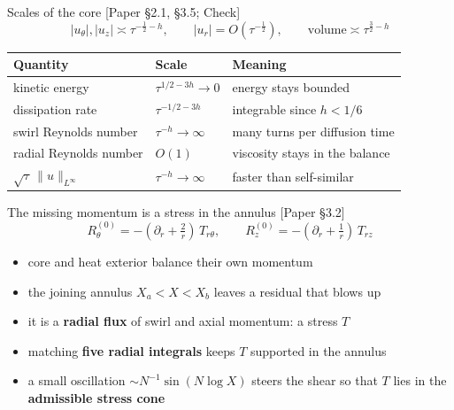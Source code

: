 \documentclass[aspectratio=169,11pt]{beamer}
\newcommand{\src}[1]{{\scriptsize\color{accent}\textsf{[#1]}}}
\begin{document}
\begin{frame}{Scales of the core \src{Paper \S2.1, \S3.5; Check}}
\centering
\[
|u_\theta|,|u_z|\asymp\tau^{-\frac12-h},\qquad |u_r|=O(\tau^{-\frac12}),\qquad \text{volume}\asymp\tau^{\frac32-h}
\]
\small
\begin{tabular}{@{}lll@{}}
\toprule
Quantity & Scale & Meaning\\
\midrule
kinetic energy & $\tau^{1/2-3h}\to0$ & energy stays bounded\\
dissipation rate & $\tau^{-1/2-3h}$ & integrable since $h<1/6$\\
swirl Reynolds number & $\tau^{-h}\to\infty$ & many turns per diffusion time\\
radial Reynolds number & $O(1)$ & viscosity stays in the balance\\
$\sqrt{\tau}\,\|u\|_{L^\infty}$ & $\tau^{-h}\to\infty$ & faster than self-similar\\
\bottomrule
\end{tabular}
\end{frame}

\begin{frame}{The missing momentum is a stress in the annulus \src{Paper \S3.2}}
\[
R^{(0)}_\theta=-(\partial_r+\tfrac2r)\,T_{r\theta},\qquad R^{(0)}_z=-(\partial_r+\tfrac1r)\,T_{rz}
\]
\begin{itemize}
\item core and heat exterior balance their own momentum
\item the joining annulus $X_a<X<X_b$ leaves a residual that blows up
\item it is a \textbf{radial flux} of swirl and axial momentum: a stress $T$
\item matching \textbf{five radial integrals} keeps $T$ supported in the annulus
\item a small oscillation $\sim N^{-1}\sin(N\log X)$ steers the shear so that $T$ lies in the \textbf{admissible stress cone}
\end{itemize}
\end{frame}
\end{document}
